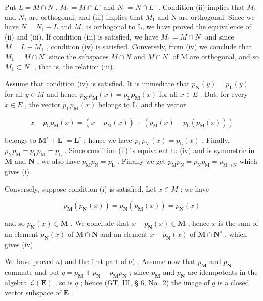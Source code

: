 Put \(L = M \cap N\) , \(M_{1} = M \cap L^{\circ}\) and \(N_{1} = N \cap L^{\circ}\) . Condition (ii) implies that \(M_{1}\) and \(N_{1}\) are orthogonal, and (iii) implies that \(M_{1}\) and N are orthogonal. Since we have \(N = N_{1} + L\) and \(M_{1}\) is orthogonal to L, we have proved the equivalence of (ii) and (iii). If condition (iii) is satisfied, we have \(M_{1} = M \cap N^{\circ}\) and since \(M = L + M_{1}\) , condition (iv) is satisfied. Conversely, from (iv) we conclude that \(M_{1} = M \cap N^{\circ}\) since the subspaces \(M \cap N\) and \(M \cap N^{\circ}\) of M are orthogonal, and so \(M_{1} \subset N^{\circ}\) , that is, the relation (iii).

Assume that condition (iv) is satisfied. It is immediate that \(p_{\mathbf{N}}(y) = p_{\mathbf{L}}(y)\) for all \(y \in M\) and hence \(p_{\mathbf{N}}p_{\mathbf{M}}(x) = p_{\mathbf{L}}p_{\mathbf{M}}(x)\) for all \(x \in E\) . But, for every \(x \in E\) , the vector \(p_{\mathbf{L}}p_{\mathbf{M}}(x)\) belongs to L, and the vector

\[
x - p _ {\mathrm{L}} p _ {\mathrm{M}} (x) = \left(x - p _ {\mathrm{M}} (x)\right) + \left(p _ {\mathrm{M}} (x) - p _ {\mathrm{L}} \left(p _ {\mathrm{M}} (x)\right)\right)
\]

belongs to \(\mathbf{M}^{\circ} + \mathbf{L}^{\circ} = \mathbf{L}^{\circ}\) ; hence we have \(p_{\mathrm{L}}p_{\mathrm{M}}(x) = p_{\mathrm{L}}(x)\) . Finally, \(p_{\mathrm{N}}p_{\mathrm{M}} = p_{\mathrm{L}}p_{\mathrm{M}} = p_{\mathrm{L}}\) . Since condition (ii) is equivalent to (iv) and is symmetric in \(\mathbf{M}\) and \(\mathbf{N}\) , we also have \(p_{\mathrm{M}}p_{\mathrm{N}} = p_{\mathrm{L}}\) . Finally we get \(p_{\mathrm{M}}p_{\mathrm{N}} = p_{\mathrm{N}}p_{\mathrm{M}} = p_{\mathrm{M}\cap \mathrm{N}}\) which gives (i).

Conversely, suppose condition (i) is satisfied. Let \(x \in M\) ; we have

\[
p _ {\mathbf {M}} (p _ {\mathbf {N}} (x)) = p _ {\mathbf {N}} (p _ {\mathbf {M}} (x)) = p _ {\mathbf {N}} (x)
\]

and so \(p_{\mathbf{N}}(x) \in \mathbf{M}\) . We conclude that \(x - p_{\mathbf{N}}(x) \in \mathbf{M}\) , hence \(x\) is the sum of an element \(p_{\mathbf{N}}(x)\) of \(\mathbf{M} \cap \mathbf{N}\) and an element \(x - p_{\mathbf{N}}(x)\) of \(\mathbf{M} \cap \mathbf{N}^{\circ}\) , which gives (iv).

We have proved \(a)\) and the first part of \(b)\) . Assume now that \(p_{\mathbf{M}}\) and \(p_{\mathbf{N}}\) commute and put \(q = p_{\mathbf{M}} + p_{\mathbf{N}} - p_{\mathbf{M}}p_{\mathbf{N}}\) ; since \(p_{\mathbf{M}}\) and \(p_{\mathbf{N}}\) are idempotents in the algebra \(\mathcal{L}(\mathbf{E})\) , so is \(q\) ; hence (GT, III, § 6, No.~2) the image of \(q\) is a closed vector subspace of \(\mathbf{E}\) .

